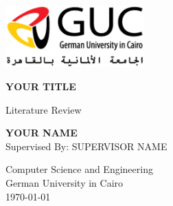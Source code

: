 \begin{titlepage}
  \begin{center}
      \includegraphics[width=0.4\textwidth]{guc_logo_og.png}
      \vspace*{1cm}

      \textbf{YOUR TITLE}
      \vspace{0.5cm}

       Literature Review
      \vspace{1.0cm}

      \textbf{YOUR NAME} \\
      \vspace{0.5cm}
      Supervised By: SUPERVISOR NAME
      \vfill

      Computer Science and Engineering\\
      German University in Cairo\\
      \today
  \end{center}
\end{titlepage}

